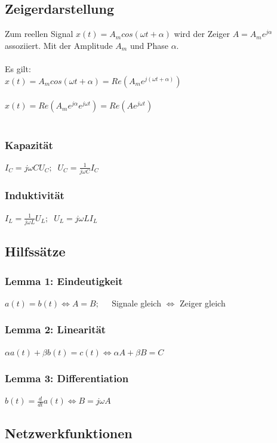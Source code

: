 \documentclass[a4paper,twocolumn,10pt]{article}
\begin{document}
\subsection*{Zeigerdarstellung}
Zum reellen Signal $x(t)=A_m cos(\omega t+\alpha)$ wird der Zeiger $A=A_m e^{j\alpha}$ assoziiert. Mit der Amplitude $A_m$ und Phase $\alpha$.\\\\
Es gilt:\\
$x(t)=A_m cos(\omega t+\alpha)=Re(A_m e^{j(\omega t+\alpha)})$\\\\
$x(t)=Re(A_m e^{j\alpha}e^{j\omega t})=Re(Ae^{j\omega t})$\\\\
\begin{minipage}[t]{0.23\textwidth}
\subsubsection*{Kapazität}
$I_C=j\omega CU_C;\;\;U_C=\frac{1}{j\omega C}I_C$
\end{minipage}
\hfill
\begin{minipage}[t]{0.23\textwidth}
\subsubsection*{Induktivität}
$I_L=\frac{1}{j\omega L}U_L;\;\;U_L=j\omega LI_L$
\end{minipage}
\subsection*{Hilfssätze}
\subsubsection*{Lemma 1: Eindeutigkeit}
$a(t)=b(t)\Leftrightarrow A=B;\;\;\;\;$ Signale gleich $\Leftrightarrow$ Zeiger gleich
\subsubsection*{Lemma 2: Linearität}
$\alpha a(t)+\beta b(t)=c(t)\Leftrightarrow \alpha A+\beta B=C$
\subsubsection*{Lemma 3: Differentiation}
$b(t)=\frac{d}{dt}a(t)\Leftrightarrow B=j\omega A$
\subsection*{Netzwerkfunktionen}
\end{document}
